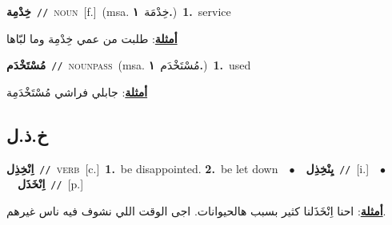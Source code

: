 \documentclass[10pt,a4paper,twoside]{article} %
\begin{document}
\begin{multicols}{2}
{{{{{{{{{{\setlength\topsep{0pt}\textbf{\foreignlanguage{arabic}{خِدْمِة}}\ {\color{gray}\texttt{//}\color{black}}\ \textsc{noun}\ [f.]\ \color{gray}(msa. \foreignlanguage{arabic}{خِدْمَة}~\foreignlanguage{arabic}{\textbf{١.}})\color{black}\ \textbf{1.}~service\  \begin{flushright}\color{gray}\foreignlanguage{arabic}{\textbf{\underline{\foreignlanguage{arabic}{أمثلة}}}: طلبت من عمي خِدْمِة وما لبّاها}\end{flushright}\color{black}} \vspace{2mm}

{\setlength\topsep{0pt}\textbf{\foreignlanguage{arabic}{مُسْتَخْدَم}}\ {\color{gray}\texttt{//}\color{black}}\ \textsc{noun\textunderscore pass}\ \color{gray}(msa. \foreignlanguage{arabic}{مُسْتَخْدَم}~\foreignlanguage{arabic}{\textbf{١.}})\color{black}\ \textbf{1.}~used\  \begin{flushright}\color{gray}\foreignlanguage{arabic}{\textbf{\underline{\foreignlanguage{arabic}{أمثلة}}}: جابلي فراشي مُسْتَخْدَمِة}\end{flushright}\color{black}} \vspace{2mm}

\vspace{-3mm}
\subsection*{\color{blue}\foreignlanguage{arabic}{خ.ذ.ل}\color{blue}{}} 

{\setlength\topsep{0pt}\textbf{\foreignlanguage{arabic}{اِنْخِذِل}}\ {\color{gray}\texttt{//}\color{black}}\ \textsc{verb}\ [c.]\ \textbf{1.}~be disappointed.  \textbf{2.}~be let down\ \ $\bullet$\ \ \setlength\topsep{0pt}\textbf{\foreignlanguage{arabic}{يِنْخِذِل}}\ {\color{gray}\texttt{//}\color{black}}\ [i.]\ \ $\bullet$\ \ \setlength\topsep{0pt}\textbf{\foreignlanguage{arabic}{اِنْخَذَل}}\ {\color{gray}\texttt{//}\color{black}}\ [p.]\  \begin{flushright}\color{gray}\foreignlanguage{arabic}{\textbf{\underline{\foreignlanguage{arabic}{أمثلة}}}: احنا اِنْخَذَلنا كثير بسبب هالحيوانات. اجى الوقت اللي نشوف فيه ناس غيرهم.}\end{flushright}\color{black}} \vspace{2mm}

}}}}}}}}}
\end{multicols}
\end{document}
